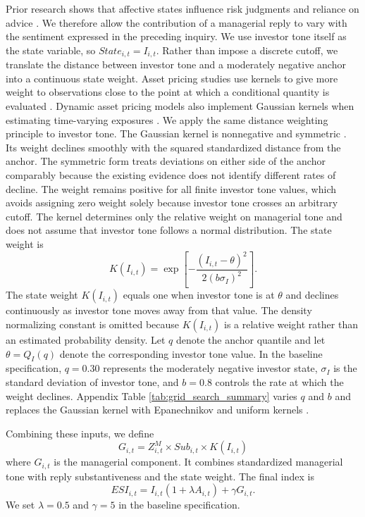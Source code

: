 \documentclass[12pt]{article}
\begin{document}
Prior research shows that affective states influence risk judgments and reliance on advice \citep{gino2012,loewenstein2001risk}. We therefore allow the contribution of a managerial reply to vary with the sentiment expressed in the preceding inquiry. We use investor tone itself as the state variable, so $State_{i,t}=I_{i,t}$. Rather than impose a discrete cutoff, we translate the distance between investor tone and a moderately negative anchor into a continuous state weight. Asset pricing studies use kernels to give more weight to observations close to the point at which a conditional quantity is evaluated \citep{aitsahalia1998,ang2012testing}. Dynamic asset pricing models also implement Gaussian kernels when estimating time-varying exposures \citep{adrian2015regression}. We apply the same distance weighting principle to investor tone. The Gaussian kernel is nonnegative and symmetric \citep{silverman1986density}. Its weight declines smoothly with the squared standardized distance from the anchor. The symmetric form treats deviations on either side of the anchor comparably because the existing evidence does not identify different rates of decline. The weight remains positive for all finite investor tone values, which avoids assigning zero weight solely because investor tone crosses an arbitrary cutoff. The kernel determines only the relative weight on managerial tone and does not assume that investor tone follows a normal distribution. The state weight is
\begin{equation}
K(I_{i,t})=\exp\left[-\frac{(I_{i,t}-\theta)^2}{2(b\sigma_I)^2}\right].
\end{equation}
\noindent The state weight $K(I_{i,t})$ equals one when investor tone is at $\theta$ and declines continuously as investor tone moves away from that value. The density normalizing constant is omitted because $K(I_{i,t})$ is a relative weight rather than an estimated probability density. Let $q$ denote the anchor quantile and let $\theta=Q_I(q)$ denote the corresponding investor tone value. In the baseline specification, $q=0.30$ represents the moderately negative investor state, $\sigma_I$ is the standard deviation of investor tone, and $b=0.8$ controls the rate at which the weight declines. Appendix Table \ref{tab:grid_search_summary} varies $q$ and $b$ and replaces the Gaussian kernel with Epanechnikov and uniform kernels \citep{epanechnikov1969}.

Combining these inputs, we define
\begin{equation}
G_{i,t}=Z^M_{i,t}\times Sub_{i,t}\times K(I_{i,t})
\end{equation}
\noindent where $G_{i,t}$ is the managerial component. It combines standardized managerial tone with reply substantiveness and the state weight.
\noindent The final index is
\begin{equation}
\label{eq:esi}
ESI_{i,t}=I_{i,t}(1+\lambda A_{i,t})+\gamma G_{i,t}.
\end{equation}
\noindent We set $\lambda=0.5$ and $\gamma=5$ in the baseline specification.
\end{document}
